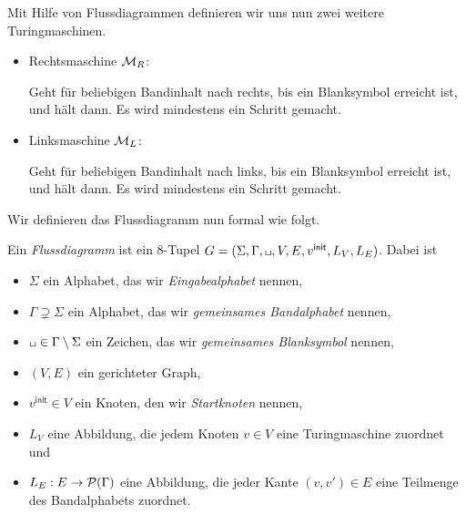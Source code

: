 \begin{Bsp}
 Mit Hilfe von Flussdiagrammen definieren wir uns nun zwei weitere Turingmaschinen.
  \begin{itemize}
  \item Rechtsmaschine $\mathcal{M}_R$:
  
  Geht für beliebigen Bandinhalt nach rechts, bis ein Blanksymbol erreicht ist, und hält dann.
  Es wird mindestens ein Schritt gemacht.
  

  
  \item Linksmaschine $\mathcal{M}_L$:
  
  Geht für beliebigen Bandinhalt nach links, bis ein Blanksymbol erreicht ist, und hält dann.
  Es wird mindestens ein Schritt gemacht.

  \qedhere
 \end{itemize}
\end{Bsp}

Wir definieren das Flussdiagramm nun formal wie folgt.


\begin{Def}%
Ein \emph{Flussdiagramm} ist ein 8-Tupel $G=(\Sigma, \Gamma, \blank,V,E,v^\mathsf{init},L_V,L_E)$.
Dabei ist
\begin{itemize}
 \item $\Sigma$ ein Alphabet, das wir \emph{Eingabealphabet} nennen,
 \item $\Gamma\supsetneq \Sigma$ ein Alphabet, das wir \emph{gemeinsames Bandalphabet} nennen,
 \item $\blank\in \Gamma\setminus\Sigma$ ein Zeichen, das wir \emph{gemeinsames Blanksymbol} nennen,
 \item $(V,E)$ ein gerichteter Graph,
 \item $v^\mathsf{init}\in V$ ein Knoten, den wir \emph{Startknoten} nennen,
 \item $L_V$ eine Abbildung, die jedem Knoten $v \in V$ eine Turingmaschine zuordnet und
 \item $L_E: E \to \mathcal{P}(\Gamma)$ eine Abbildung, die jeder Kante $(v,v')\in E$ eine Teilmenge des Bandalphabets zuordnet.
 \qedhere
\end{itemize}
\end{Def}


